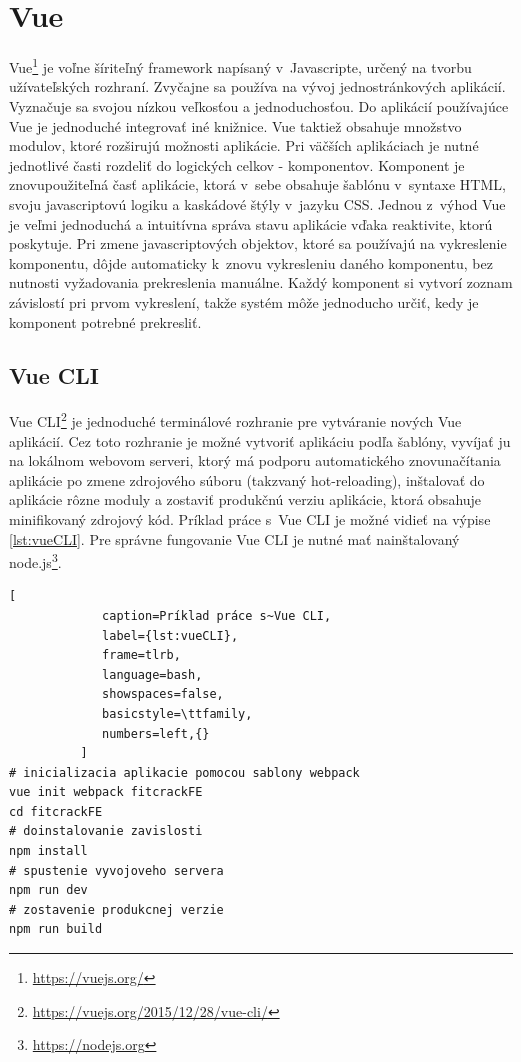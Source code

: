 \documentclass[zadani,slovak]{fitthesis}
\begin{document}
\section{Vue}\label{vue}
Vue\footnote{\url{https://vuejs.org/}} je voľne šíriteľný framework napísaný v~Javascripte, určený na tvorbu užívateľských rozhraní. Zvyčajne sa používa na vývoj jednostránkových aplikácií. Vyznačuje sa svojou nízkou veľkosťou a jednoduchosťou. Do aplikácií používajúce Vue je jednoduché integrovať iné knižnice. Vue taktiež obsahuje množstvo modulov, ktoré rozširujú možnosti aplikácie. Pri väčších aplikáciach je nutné jednotlivé časti rozdeliť do logických celkov - komponentov. Komponent je znovupoužiteľná časť aplikácie, ktorá v~sebe obsahuje šablónu v~syntaxe HTML, svoju javascriptovú logiku a kaskádové štýly v~jazyku CSS. Jednou z~výhod Vue je veľmi jednoduchá a intuitívna správa stavu aplikácie vďaka reaktivite, ktorú poskytuje. Pri zmene javascriptových objektov, ktoré sa používajú na vykreslenie komponentu, dôjde automaticky k~znovu vykresleniu daného komponentu, bez nutnosti vyžadovania prekreslenia manuálne. Každý komponent si vytvorí zoznam závislostí pri prvom vykreslení, takže systém môže jednoducho určiť, kedy je komponent potrebné prekresliť.

\subsection{Vue CLI}\label{vueCli}
Vue CLI\footnote{\url{https://vuejs.org/2015/12/28/vue-cli/}} je jednoduché terminálové rozhranie pre vytváranie nových Vue aplikácií. Cez toto rozhranie je možné vytvoriť aplikáciu podľa šablóny, vyvíjať ju na lokálnom webovom serveri, ktorý má podporu automatického znovunačítania aplikácie po zmene zdrojového súboru (takzvaný hot-reloading), inštalovať do aplikácie rôzne moduly a zostaviť produkčnú verziu aplikácie, ktorá obsahuje minifikovaný zdrojový kód. Príklad práce s~Vue CLI je možné vidieť na výpise \ref{lst:vueCLI}. Pre správne fungovanie Vue CLI je nutné mať nainštalovaný node.js\footnote{\url{https://nodejs.org}}.

\begin{lstlisting}[
             caption=Príklad práce s~Vue CLI,
             label={lst:vueCLI},
             frame=tlrb,
             language=bash,
             showspaces=false,
             basicstyle=\ttfamily,
             numbers=left,{}
          ]
# inicializacia aplikacie pomocou sablony webpack
vue init webpack fitcrackFE
cd fitcrackFE
# doinstalovanie zavislosti
npm install
# spustenie vyvojoveho servera
npm run dev
# zostavenie produkcnej verzie
npm run build
\end{lstlisting}
\end{document}
